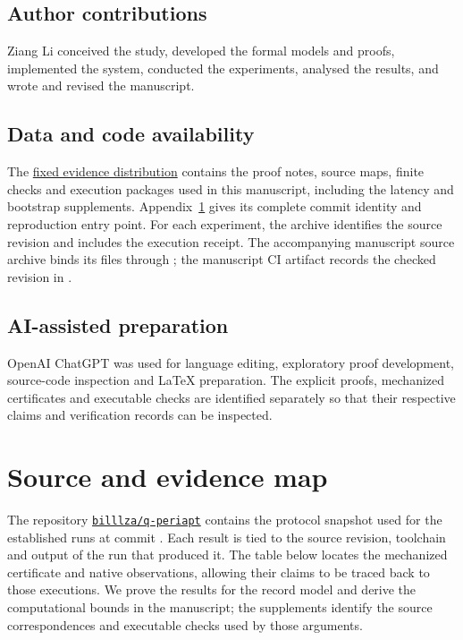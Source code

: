 \documentclass[pdflatex]{sn-jnl}
\theoremstyle{thmstyleone}
\theoremstyle{thmstylethree}
\theoremstyle{thmstyletwo}
\begin{document}
\subsection*{Author contributions}
Ziang Li conceived the study, developed the formal models and proofs,
implemented the system, conducted the experiments, analysed the results,
and wrote and revised the manuscript.

\subsection*{Data and code availability}
The \href{https://github.com/billlza/q-periapt/tree/947297e59be9d7fc8febb5d81a4e2b945e328208/paper/continuity}{fixed evidence distribution}
contains the proof notes, source maps, finite checks and execution
packages used in this manuscript, including the latency and bootstrap
supplements. Appendix~\ref{app:artifacts} gives its complete commit identity
and reproduction entry point. For each experiment, the archive identifies
the source revision and includes the execution receipt. The accompanying manuscript source
archive binds its files through ; the manuscript CI
artifact records the checked revision in .

\subsection*{AI-assisted preparation}
OpenAI ChatGPT was used for language editing, exploratory proof development,
source-code inspection and \LaTeX{} preparation. The explicit proofs,
mechanized certificates and executable checks are identified separately
so that their respective claims and verification records can be inspected.


\appendix
\section{Source and evidence map}
\label{app:artifacts}

The repository \href{https://github.com/billlza/q-periapt}{\texttt{billlza/q-periapt}}
contains the protocol snapshot used for the established runs at commit
.
Each result is tied to the source revision, toolchain and output of
the run that produced it. The table below locates the mechanized
certificate and native observations, allowing their claims to be traced
back to those executions. We prove the results for the record model and
derive the computational bounds in the manuscript; the supplements
identify the source correspondences and executable checks used by those arguments.
\end{document}
